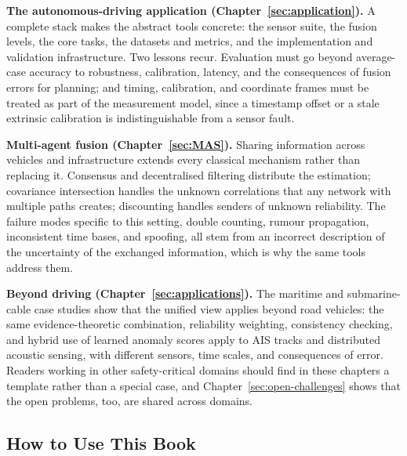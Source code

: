 \textbf{The autonomous-driving application (Chapter~\ref{sec:application}).} A complete stack makes the abstract tools concrete: the sensor suite, the fusion levels, the core tasks, the datasets and metrics, and the implementation and validation infrastructure. Two lessons recur. Evaluation must go beyond average-case accuracy to robustness, calibration, latency, and the consequences of fusion errors for planning; and timing, calibration, and coordinate frames must be treated as part of the measurement model, since a timestamp offset or a stale extrinsic calibration is indistinguishable from a sensor fault.

\textbf{Multi-agent fusion (Chapter~\ref{sec:MAS}).} Sharing information across vehicles and infrastructure extends every classical mechanism rather than replacing it. Consensus and decentralised filtering distribute the estimation; covariance intersection handles the unknown correlations that any network with multiple paths creates; discounting handles senders of unknown reliability. The failure modes specific to this setting, double counting, rumour propagation, inconsistent time bases, and spoofing, all stem from an incorrect description of the uncertainty of the exchanged information, which is why the same tools address them.

\textbf{Beyond driving (Chapter~\ref{sec:applications}).} The maritime and submarine-cable case studies show that the unified view applies beyond road vehicles: the same evidence-theoretic combination, reliability weighting, consistency checking, and hybrid use of learned anomaly scores apply to AIS tracks and distributed acoustic sensing, with different sensors, time scales, and consequences of error. Readers working in other safety-critical domains should find in these chapters a template rather than a special case, and Chapter~\ref{sec:open-challenges} shows that the open problems, too, are shared across domains.

\subsection*{How to Use This Book}

